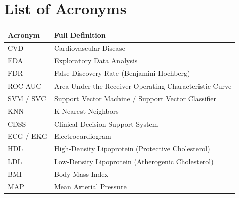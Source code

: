 \documentclass[11pt,a4paper,oneside]{report}
\begin{document}
\section*{List of Acronyms}
\begin{table}[H]
\small
\begin{tabular}{ll}
\toprule
\textbf{Acronym} & \textbf{Full Definition} \\
\midrule
CVD & Cardiovascular Disease \\
EDA & Exploratory Data Analysis \\
FDR & False Discovery Rate (Benjamini-Hochberg) \\
ROC-AUC & Area Under the Receiver Operating Characteristic Curve \\
SVM / SVC & Support Vector Machine / Support Vector Classifier \\
KNN & K-Nearest Neighbors \\
CDSS & Clinical Decision Support System \\
ECG / EKG & Electrocardiogram \\
HDL & High-Density Lipoprotein (Protective Cholesterol) \\
LDL & Low-Density Lipoprotein (Atherogenic Cholesterol) \\
BMI & Body Mass Index \\
MAP & Mean Arterial Pressure \\
\bottomrule
\end{tabular}
\end{table}

\newpage
{}














\newpage


\end{document}
